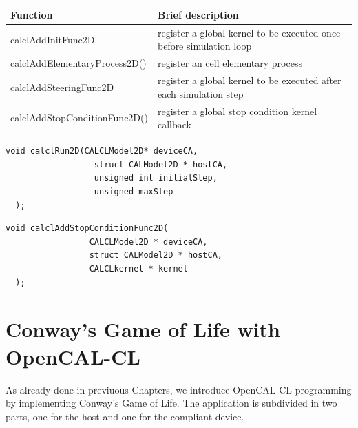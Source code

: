 \begin{table}
  \centering
  \begin{footnotesize}
  \begin{tabular}{l|l}
    \hline
    Function & Brief description\\
    \hline
    \hline
    calclAddInitFunc2D             & register a global kernel to be executed once before simulation loop \\
    calclAddElementaryProcess2D()  & register an cell elementary process \\
    calclAddSteeringFunc2D         & register a global kernel to be executed after each simulation step \\
    calclAddStopConditionFunc2D()  & register a global stop condition kernel callback \\
    \hline
    \end{tabular}
    \end{footnotesize}
  \caption{}
  \label{tab:XXX}
\end{table}



\begin{lstlisting}[float,floatplacement=H, label=lst:calclRun2D, caption=The calclRun2D function., numbers=none]
  void calclRun2D(CALCLModel2D* deviceCA,
                  struct CALModel2D * hostCA,
                  unsigned int initialStep,
                  unsigned maxStep
  );
\end{lstlisting}


\begin{lstlisting}[float,floatplacement=H, label=lst:calclAddStopConditionFunc2D, caption=The calclAddStopConditionFunc2D function., numbers=none]
  void calclAddStopConditionFunc2D(
                 CALCLModel2D * deviceCA,
                 struct CALModel2D * hostCA,
                 CALCLkernel * kernel
  );
\end{lstlisting}


\section{Conway's Game of Life with OpenCAL-CL}\label{sec:calcl_life}

As already done in previuous Chapters, we introduce OpenCAL-CL
programming by implementing Conway's Game of Life. The application is
subdivided in two parts, one for the host and one for the compliant
device.




